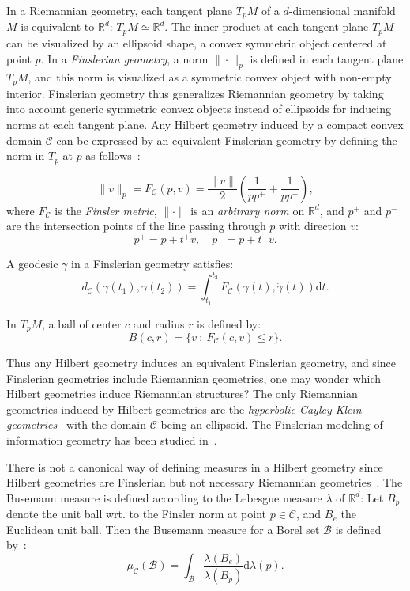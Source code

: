 \documentclass[graybox]{svmult}
\def\dt{\mathrm{d}t}
\def\calB{\mathcal{B}}
\def\calC{\mathcal{C}}
\def\bbR{\mathbb{R}}
\begin{document}
In a Riemannian geometry, each tangent plane $T_pM$ of a $d$-dimensional manifold $M$ is equivalent to $\bbR^d$: $T_pM\simeq \bbR^d$.
The inner product at each tangent plane $T_pM$ can be visualized by an ellipsoid shape, a convex symmetric object centered at point $p$.
In a {\em Finslerian geometry},  a norm $\|\cdot\|_p$ is defined in each tangent plane $T_pM$, 
and this norm is visualized as a symmetric convex object with non-empty interior. 
Finslerian geometry thus generalizes Riemannian geometry by taking into account generic symmetric convex objects instead of ellipsoids for inducing norms at each tangent plane.
Any Hilbert geometry induced by a compact convex domain $\calC$ can be expressed by an equivalent Finslerian geometry by defining the norm in $T_p$ at $p$ as follows~\cite{Vernicos-2004}:

\begin{equation*}
\|v\|_p = F_\calC(p,v) =\frac{\|v\|}{2} \left( \frac{1}{pp^+} + \frac{1}{pp^-} \right),
\end{equation*}
where 
$F_\calC$ is the {\em Finsler metric},
$\|\cdot\|$ is an {\em arbitrary norm} on $\bbR^d$,
and $p^+$ and $p^-$ are the intersection points of the line passing through $p$ with direction $v$:
$$
p^+=p+t^+v,\quad p^-=p+t^-v.
$$


A geodesic $\gamma$ in a Finslerian geometry satisfies:
\begin{equation*}
d_\calC(\gamma(t_1),\gamma(t_2)) = \int_{t_1}^{t_2} F_\calC(\gamma(t),\dot\gamma(t)) \dt .
\end{equation*}

In $T_pM$, a ball of center $c$ and radius $r$ is defined by:
\begin{equation*}
B(c,r)=\{ v \ : \ F_\calC(c,v) \leq r \}.
\end{equation*}

Thus any Hilbert geometry induces an equivalent Finslerian geometry, and since Finslerian geometries include Riemannian geometries, one may wonder which Hilbert geometries induce Riemannian structures?
The only Riemannian geometries induced by Hilbert geometries are the {\em hyperbolic Cayley-Klein geometries}~\cite{Richter-2011,LMNN-2016,CayleyClassification-2016} with the domain $\calC$ being an ellipsoid.
The Finslerian modeling of information geometry has been studied in~\cite{Cena-2002,FinslerIG-2016}.

There is not a canonical way of defining measures in a Hilbert geometry since Hilbert geometries are Finslerian but not necessary Riemannian geometries~\cite{Vernicos-2004}. The Busemann measure is defined according to the Lebesgue measure $\lambda$ of $\bbR^d$: Let $B_p$ denote the unit ball wrt. to the Finsler norm at point $p\in\calC$, and $B_e$ the Euclidean unit ball. Then the Busemann measure for a Borel set $\calB$ is defined by~\cite{Vernicos-2004}:
$$
\mu_\calC(\calB) = \int_\calB \frac{\lambda(B_e)}{\lambda(B_p)} \mathrm{d}\lambda(p).
$$
\end{document}
